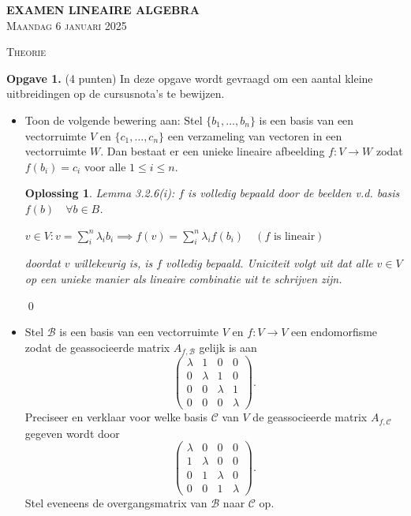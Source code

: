 \documentclass[a4paper,12pt]{article}
\newtheorem{oplossing}{Oplossing}
\begin{document}
\begin{enumerate}
\begin{center}
    \Large\textbf{EXAMEN LINEAIRE ALGEBRA} \\[0.5cm]
    \large\textsc{Maandag 6 januari 2025} \\[0.5cm]
\end{center}

\vspace{1cm}

\begin{center}
    \textsc{Theorie}
\end{center}

\textbf{Opgave 1.} (4 punten) In deze opgave wordt gevraagd om een aantal kleine uitbreidingen op de cursusnota's te bewijzen.
\begin{itemize}
    \item[(i)] Toon de volgende bewering aan: Stel $\{b_1, \dots, b_n\}$ is een basis van een vectorruimte $V$ en $\{c_1, \dots, c_n\}$ een verzameling van vectoren in een vectorruimte $W$. Dan bestaat er een unieke lineaire afbeelding $f : V \to W$ zodat $f(b_i) = c_i$ voor alle $1 \leq i \leq n$.
    \begin{oplossing}
    Lemma 3.2.6(i): $f$ is volledig bepaald door de beelden v.d. basis $f(b) \quad \forall b \in B$.



    $v \in V: v = \sum_i^n \lambda_i b_i \implies f(v) = \sum_i^n \lambda_i f(b_i) \quad (f \text{ is lineair})$


    doordat $v$ willekeurig is, is $f$ volledig bepaald.
    Uniciteit volgt uit dat alle $v \in V$ op een unieke manier als lineaire combinatie uit te schrijven zijn.
    \end{oplossing} \qed

    \item[(ii)] Stel $\mathcal{B}$ is een basis van een vectorruimte $V$ en $f : V \to V$ een endomorfisme zodat de geassocieerde matrix $A_{f,\mathcal{B}}$ gelijk is aan
    \[
    \begin{pmatrix}
    \lambda & 1 & 0 & 0 \\
    0 & \lambda & 1 & 0 \\
    0 & 0 & \lambda & 1 \\
    0 & 0 & 0 & \lambda
    \end{pmatrix}.
    \]
    Preciseer en verklaar voor welke basis $\mathcal{C}$ van $V$ de geassocieerde matrix $A_{f,\mathcal{C}}$ gegeven wordt door
    \[
    \begin{pmatrix}
    \lambda & 0 & 0 & 0 \\
    1 & \lambda & 0 & 0 \\
    0 & 1 & \lambda & 0 \\
    0 & 0 & 1 & \lambda
    \end{pmatrix}.
    \]
    Stel eveneens de overgangsmatrix van $\mathcal{B}$ naar $\mathcal{C}$ op.


\end{itemize}
\end{enumerate}
\end{document}
